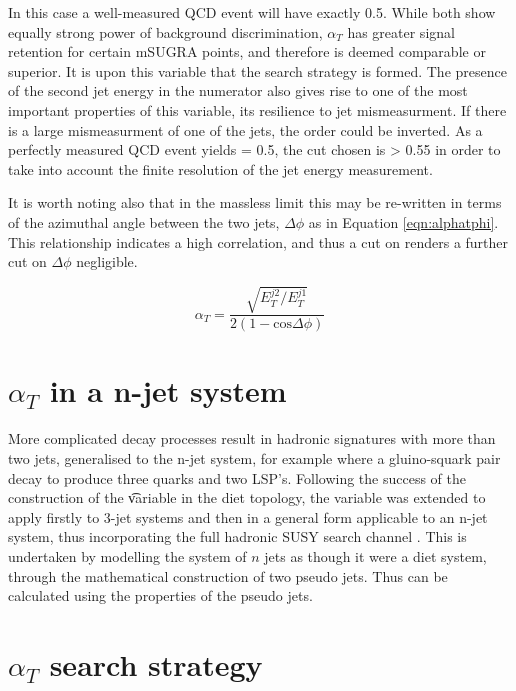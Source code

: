 In this case a well-measured QCD event will have exactly 0.5. While both show equally strong power of background discrimination, $\alpha_{T}$ has greater signal retention for certain mSUGRA points,\cite{PASaT} and therefore is deemed comparable or superior. It is upon this variable that the search strategy is formed. The presence of the second jet energy in the numerator also gives rise to one of the most important properties of this variable, its resilience to jet mismeasurment. If there is a large mismeasurment of one of the jets, the order could be inverted. As a perfectly measured QCD event yields \alt = 0.5, the cut chosen is \alt > 0.55 in order to take into account the finite resolution of the jet energy measurement.  

 It is worth noting also that in the massless limit this may be re-written in terms of the azimuthal angle between the two jets, $\Delta \phi$ as in Equation \ref{eqn:alphatphi}. This relationship indicates a high correlation, and thus a cut on \alt renders a further cut on $\Delta \phi$ negligible\cite{ANaT}.

\begin{equation}
\alpha_{T} = \frac{\sqrt{E_{T}^{j2}/E_{T}^{j1}}}{2(1- \textrm{cos} \Delta \phi)} 
\label{eqn:alphat}
\end{equation}


\section{$\alpha_{T}$ in a n-jet system}
More complicated decay processes result in hadronic signatures with more than two jets, generalised to the n-jet system, for example where a gluino-squark pair decay to produce three quarks and two LSP's. Following the success of the construction of the \a\t variable in the diet topology, the variable was extended to apply firstly to 3-jet systems and then in a general form applicable to an n-jet system, thus incorporating the full hadronic SUSY search channel\cite{ANnaT} . This is undertaken by modelling the system of $n$ jets as though it were a diet system, through the mathematical construction of two pseudo jets. Thus \alt can be calculated using the properties of the pseudo jets. 




\section{$\alpha_{T}$ search strategy}

